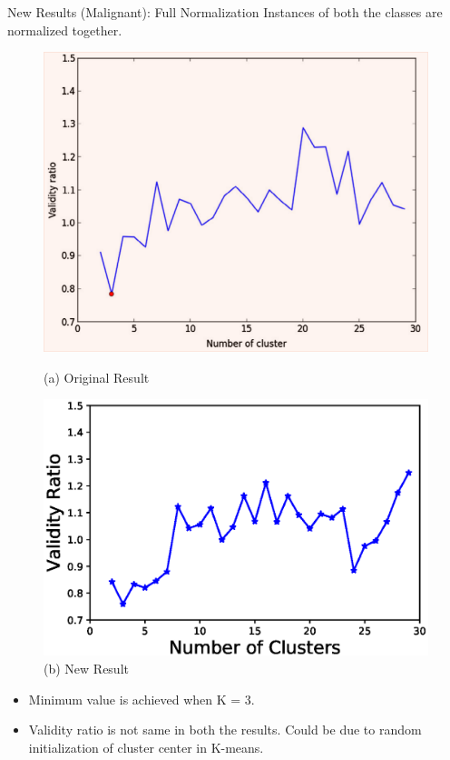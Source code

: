 \documentclass[xcolor=dvipsnames]{beamer}
\begin{document}
\begin{frame}{New Results (Malignant): Full Normalization}
Instances of both the classes are normalized together.
\begin{figure}[H]
\begin{minipage}[t]{0.5\linewidth}
    \includegraphics[scale=0.2]{Figures/MalignantOriginal}
    \caption*{(a) Original Result}
\end{minipage}%
\begin{minipage}[t]{0.5\linewidth}
    \includegraphics[scale=0.43]{Figures/Malignant_VR_K_AllX.eps}
    \caption*{(b) New Result}
\end{minipage} 
\end{figure}

\begin{block}{}
\begin{itemize}
\item Minimum value is achieved when K = 3.
\item Validity ratio is not same in both the results. Could be due to random initialization of cluster center in K-means.
\end{itemize} 
\end{block}
\end{frame}
\end{document}
